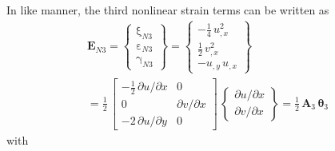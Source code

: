 In like manner, the third nonlinear strain terms can be written as
\begin{multline}
		\mathbf{E}_{N3} =  \begin{Bmatrix}
			\mathrm \xi_{N3} \\
			\mathrm \varepsilon_{N3} \\
			\mathrm \gamma_{N3} \end{Bmatrix} =
		\begin{Bmatrix}
			-\tfrac{1}{4} \, u_{,x}^2  \\
			\tfrac{1}{2} \, v_{,x}^2  \\
			-u_{,y} \, u_{,x}  \end{Bmatrix} \\ = \frac{1}{2} \, \begin{bmatrix}
			-\tfrac{1}{2} \, \partial u / \partial x & 0  \\
			0 & \partial v / \partial x \\
			-2 \, \partial u / \partial y  & 0  \end{bmatrix} \, \begin{Bmatrix}
			\partial u / \partial x\\
			\partial v / \partial x
		\end{Bmatrix} = \tfrac{1}{2} \, \mathbf{A}_3 \, \boldsymbol{\theta}_3
\end{multline}
with 
